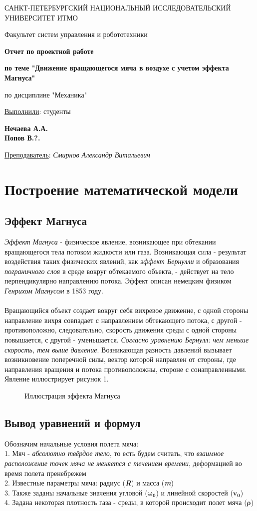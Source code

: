 \documentclass[a5paper, 10pt]{article}
\theoremstyle{definition}
\theoremstyle{plain}
\theoremstyle{remark}
\newcommand*{\titlePage}{
	\thispagestyle{title}
	\begingroup
	\begin{center}
		\vspace*{6ex}
		
		{\small
			САНКТ-ПЕТЕРБУРГСКИЙ НАЦИОНАЛЬНЫЙ ИССЛЕДОВАТЕЛЬСКИЙ УНИВЕРСИТЕТ ИТМО	
		}
		
		\vspace*{2ex}
		
		{\normalsize
			Факультет систем управления и робототехники
		}
		
		\vspace*{15ex}
		
		{\Large \bfseries 
			Отчет по проектной работе
		}
\vspace*{2ex}
		
		{\Large \bfseries 
			по теме "Движение вращающегося мяча в воздухе с учетом эффекта Магнуса"
		}
\vspace*{2ex}
		
		{\Large
			по дисциплине "Механика"
		}

	\end{center}
	\vspace*{20ex}
	\begin{flushright}
		{\large 
			\underline{Выполнили}: студенты\\
			\begin{flushright}
				\textbf{Нечаева А.А.}\\
                                \textbf{Попов В.?.}\\
			\end{flushright}
		}
		
		\vspace*{5ex}
		
		{\large 
			\underline{Преподаватель}: \textit{Смирнов Александр Витальевич}
		}
	\end{flushright}	
	\newpage
	\setcounter{page}{2}
	\endgroup}
\begin{document}
	\titlePage
	\pagestyle{style}
\newpage
\section{Построение математической модели}
\subsection{Эффект Магнуса}
\textit{Эффект Магнуса} - физическое явление, возникающее при обтекании вращающегося тела потоком жидкости или газа. Возникающая сила - результат воздействия таких физических явлений, как \textit{эффект Бернулли} и образования \textit{пограничного слоя} в среде вокруг обтекаемого объекта, - действует на тело перпендикулярно направлению потока. Эффект описан немецким физиком \textit{Генрихом Магнусом} в 1853 году. \\\\
Вращающийся объект создает вокруг себя вихревое движение, с одной стороны направление вихря совпадает с направлением обтекающего потока, с другой - противоположно, следовательно, скорость движения среды с одной стороны повышается, с другой - уменьшается. \textit{Согласно уравнению Бернулл: чем меньше скорость, тем выше давление}. Возникающая разность давлений вызывает возникновение поперечной силы, вектор которой направлен от стороны, где направления вращения и потока противоположны, стороне с сонаправленными. Явление иллюстрирует рисунок 1.
\begin{figure}[h]
	           \caption{Иллюстрация эффекта Магнуса}
\end{figure}

\subsection{Вывод уравнений и формул}	
Обозначим начальные условия полета мяча:\\
1. Мяч - \textit{абсолютно твёрдое тело}, то есть будем считать, что \textit{взаимное расположение точек мяча не меняется с течением времени}, деформацией во время полета пренебрежем\\
2. Известные параметры мяча: радиус (\textit{\textbf{R}}) и масса (\textit{\textbf{m}})\\
3. Также заданы начальные значения угловой ($\mathbf{\omega_{0}}$) и линейной скоростей ($\mathbf{v_{0}}$)\\
4. Задана некоторая плотность газа - среды, в которой происходит полет мяча ($\mathbf{\rho}$)\\\\
\end{document}
